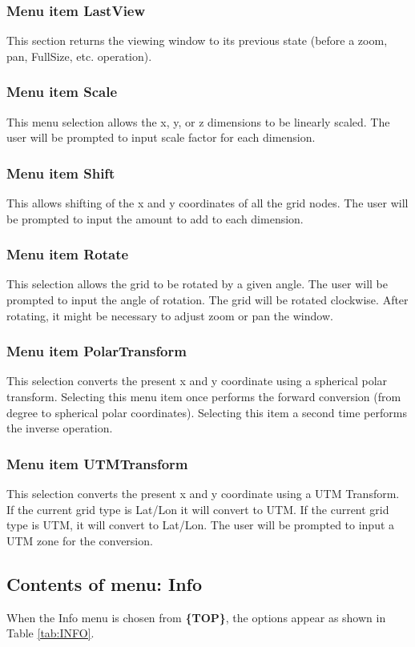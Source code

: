 \documentclass{article}
\begin{document}
\subsubsection{Menu item LastView}
This section returns the viewing window to its previous state (before a zoom, pan, FullSize, etc. operation).

\subsubsection{Menu item Scale}
This menu selection allows the x, y, or z dimensions to be linearly scaled. The user will be prompted to input scale factor for each dimension. 

\subsubsection[Menu item Shift]{Menu item Shift}
This allows shifting of the x and y coordinates of all the grid nodes. The user will be prompted to input the amount to add to each dimension.

\subsubsection{Menu item Rotate}
This selection allows the grid to be rotated by a given angle. The user will be prompted to input the angle of rotation. The grid will be rotated clockwise. After rotating, it might be necessary to adjust zoom or pan the window. 

\subsubsection{Menu item PolarTransform}
This selection converts the present x and y coordinate using a spherical polar transform.  Selecting this menu item once performs the forward conversion (from degree to spherical polar coordinates).  Selecting this item a second time performs the inverse operation.

\subsubsection{Menu item UTMTransform}
This selection converts the present x and y coordinate using a UTM Transform. If the current grid type is Lat/Lon it will convert to UTM. If the current grid type is UTM, it will convert to Lat/Lon. The user will be prompted to input a UTM zone for the conversion.


\subsection{Contents of menu: Info}
When the Info menu is chosen from \textbf{\{TOP\}}, the options appear as shown in Table \ref{tab:INFO}.
\end{document}
